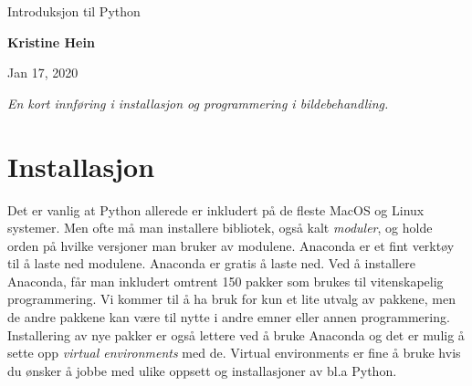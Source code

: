 \documentclass[%
oneside,                 %
final,                   %
10pt]{article}
\begin{document}

\newcommand{\exercisesection}[1]{\subsection*{#1}}






\thispagestyle{empty}

\begin{center}
{\LARGE\bf
\begin{spacing}{1.25}
{\color{seccolor} Introduksjon til Python}
\end{spacing}
}
\end{center}


\begin{center}
{\bf Kristine Hein${}^{}$} \\ [0mm]
\end{center}

\begin{center}
\end{center}
    

\begin{center}
Jan 17, 2020
\end{center}

\vspace{1cm}


\emph{En kort innføring i installasjon og programmering i bildebehandling.}




\tableofcontents


\vspace{1cm} %




\section{Installasjon}
Det er vanlig at Python allerede er inkludert på de fleste MacOS og Linux systemer.
Men ofte må man installere bibliotek, også kalt \emph{moduler}, og holde orden på hvilke versjoner man bruker av modulene.
Anaconda er et fint verktøy til å laste ned modulene.
Anaconda er gratis å laste ned. Ved å installere Anaconda, får man inkludert omtrent 150 pakker som brukes til vitenskapelig programmering. Vi kommer til å ha bruk for kun et lite utvalg av pakkene, men de andre pakkene kan være til nytte i andre emner eller annen programmering.
Installering av nye pakker er også lettere ved å bruke Anaconda og det er mulig å sette opp \emph{virtual environments} med de.
Virtual environments er fine å bruke hvis du ønsker å jobbe med ulike oppsett og installasjoner av bl.a Python.
\end{document}
